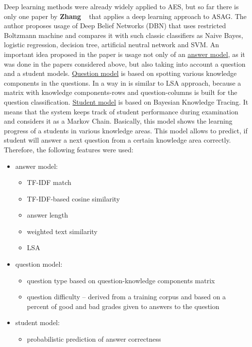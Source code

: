 Deep learning methods were already widely applied to AES, but so far there is only one paper by \textbf{Zhang} ~\cite{Zhang} that applies a deep learning approach to ASAG. The author proposes usage of Deep Belief Networks (DBN) that uses restricted Boltzmann machine and compares it with such classic classifiers as Naive Bayes, logistic regression, decision tree, artificial neutral network and SVM. An important idea proposed in the paper is usage not only of an \underline{answer model}, as it was done in the papers considered above, but also taking into account a question and a student models. \underline{Question model} is based on spotting various knowledge components in the questions. In a way in is similar to LSA approach, because a matrix with knowledge components-rows and question-columns is built for the question classification. \underline{Student model} is based on Bayesian Knowledge Tracing. It means that the system keeps track of student performance during examination and considers it as a Markov Chain. Basically, this model shows the learning progress of a students in various knowledge areas. This model allows to predict, if student will answer a next question from a certain knowledge area correctly. Therefore, the following features were used:
\begin{itemize}
\item answer model:
\begin{itemize}
\item TF-IDF match
\item TF-IDF-based cosine similarity
\item answer length
\item weighted text similarity
\item LSA
\end{itemize}
\item question model:
\begin{itemize}
\item question type based on question-knowledge components matrix
\item question difficulty -- derived from a training corpus and based on a percent of good and bad grades given to answers to the question
\end{itemize}
\item student model:
\begin{itemize}
\item probabilistic prediction of answer correctness
\end{itemize}
\end{itemize}

